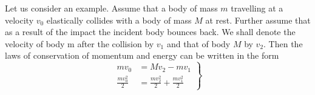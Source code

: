 \documentclass[a4paper,sfsidenotes]{tufte-book}
\begin{document}
Let us consider an example. Assume that a body of mass $m$ travelling at a velocity $v_{0}$ elastically collides with a body of mass $M$ at rest. Further assume that as a result of the impact the incident body bounces back. We shall denote the velocity of body m after the collision by $v_{1}$ and that of body $M$ by $v_{2}$. Then the laws of conservation of momentum and energy can be written in the form\\
\begin{equation} 
\left.
\begin{split}
mv_{0} & =Mv_{2}-  mv_{1} \\
\frac{mv_{0}^{2}}{2} & = \frac{mv_{2}^{2}}{2} + \frac{mv_{1}^{2}}{2}
\label{eq-59}
\end{split}
\right\}
\end{equation}
\end{document}

